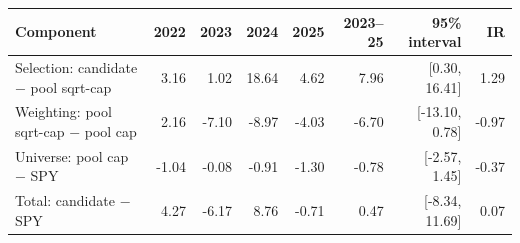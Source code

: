 \begin{tabular}{lrrrrrrr}
\toprule
Component & 2022 & 2023 & 2024 & 2025 & 2023--25 & 95\% interval & IR \\
\midrule
Selection: candidate $-$ pool sqrt-cap & 3.16 & 1.02 & 18.64 & 4.62 & 7.96 & [0.30, 16.41] & 1.29 \\
Weighting: pool sqrt-cap $-$ pool cap & 2.16 & -7.10 & -8.97 & -4.03 & -6.70 & [-13.10, 0.78] & -0.97 \\
Universe: pool cap $-$ SPY & -1.04 & -0.08 & -0.91 & -1.30 & -0.78 & [-2.57, 1.45] & -0.37 \\
Total: candidate $-$ SPY & 4.27 & -6.17 & 8.76 & -0.71 & 0.47 & [-8.34, 11.69] & 0.07 \\
\bottomrule
\end{tabular}
